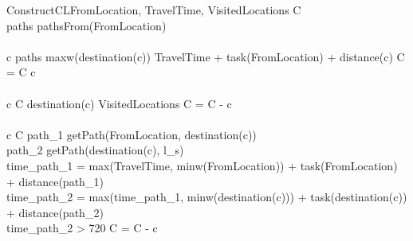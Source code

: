 \documentclass[]{report}
\begin{document}
\begin{pseudocode}{ConstructCL}{FromLocation, TravelTime, VisitedLocations}
\label{pc:construct_cl}
	C \GETS \varnothing\\
	paths \GETS pathsFrom(FromLocation)\\
	\\
	\FOREACH c \in paths \DO
		\IF maxw(destination(c)) \geq TravelTime  + task(FromLocation) + distance(c)\THEN
			C = C \cup c\\	
	\\
	\FOREACH c \in C \DO
		\IF destination(c) \in VisitedLocations \THEN
			C = C - c\\
	\\
	\FOREACH c \in C \DO
	\BEGIN
		path_{1} \GETS getPath(FromLocation, destination(c))\\
		path_{2} \GETS getPath(destination(c), l_{s})\\
		time_{path_{1}} = max(TravelTime, minw(FromLocation)) + task(FromLocation) + distance(path_{1})\\
		time_{path_{2}} = max(time_{path_{1}}, minw(destination(c))) + task(destination(c)) + distance(path_{2})\\
		\IF time_{path_{2}} > 720 \THEN
			C = C - c\\
	\END\\
	\\
\end{pseudocode}
\end{document}
